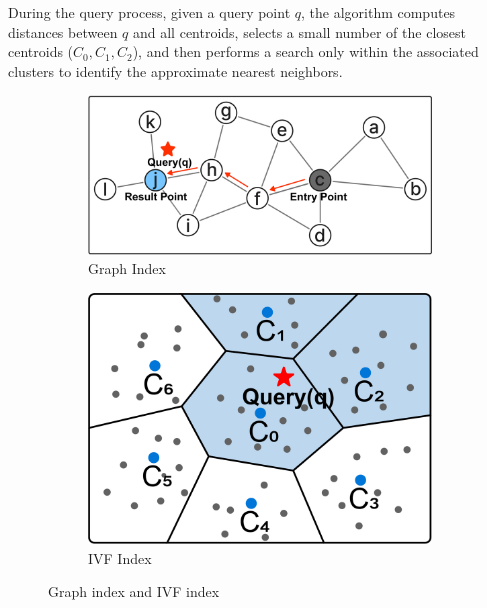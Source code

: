 \documentclass[sigconf, nonacm]{acmart}
\begin{document}
	During the query process, given a query point $q$, the algorithm computes distances between $q$ and all centroids, selects a small number of the closest centroids ($C_0, C_1, C_2$), and then performs a search only within the associated clusters to identify the approximate nearest neighbors.
	
	\begin{figure}
		\begin{subfigure}{0.60\columnwidth}
			\centering
			
			\includegraphics[width=\linewidth]{figures/graph.pdf}
			\caption{Graph Index}
			\label{fig:graph}
		\end{subfigure}
		\hfill
		\begin{subfigure}{0.38\columnwidth}
			\centering
			
			\includegraphics[width=\linewidth]{figures/ivf.pdf}
			\caption{IVF Index}
			\label{fig:ivf}
		\end{subfigure}
		
		\setlength{\abovecaptionskip}{0.1cm}
		\setlength{\belowcaptionskip}{-0.02cm}
		\caption{Graph index and IVF index}
		
	\end{figure}
	
\end{document}
